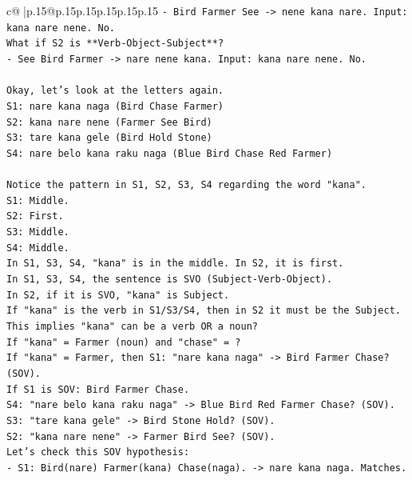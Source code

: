 \documentclass{article}
\begin{document}
{\begin{supertabular}{c@{$\;$}|p{.15\linewidth}@{}p{.15\linewidth}p{.15\linewidth}p{.15\linewidth}p{.15\linewidth}p{.15\linewidth}}
{{{\texttt{{-} Bird Farmer See {-}> nene kana nare. Input: kana nare nene. No.} \\
\texttt{What if S2 is **Verb{-}Object{-}Subject**?} \\
\texttt{{-} See Bird Farmer {-}> nare nene kana. Input: kana nare nene. No.} \\
\\ 
\texttt{Okay, let's look at the letters again.} \\
\texttt{S1: nare kana naga (Bird Chase Farmer)} \\
\texttt{S2: kana nare nene (Farmer See Bird)} \\
\texttt{S3: tare kana gele (Bird Hold Stone)} \\
\texttt{S4: nare belo kana raku naga (Blue Bird Chase Red Farmer)} \\
\\ 
\texttt{Notice the pattern in S1, S2, S3, S4 regarding the word "kana".} \\
\texttt{S1: Middle.} \\
\texttt{S2: First.} \\
\texttt{S3: Middle.} \\
\texttt{S4: Middle.} \\
\texttt{In S1, S3, S4, "kana" is in the middle. In S2, it is first.} \\
\texttt{In S1, S3, S4, the sentence is SVO (Subject{-}Verb{-}Object).} \\
\texttt{In S2, if it is SVO, "kana" is Subject.} \\
\texttt{If "kana" is the verb in S1/S3/S4, then in S2 it must be the Subject.} \\
\texttt{This implies "kana" can be a verb OR a noun?} \\
\texttt{If "kana" = Farmer (noun) and "chase" = ?} \\
\texttt{If "kana" = Farmer, then S1: "nare kana naga" {-}> Bird Farmer Chase? (SOV).} \\
\texttt{If S1 is SOV: Bird Farmer Chase.} \\
\texttt{S4: "nare belo kana raku naga" {-}> Blue Bird Red Farmer Chase? (SOV).} \\
\texttt{S3: "tare kana gele" {-}> Bird Stone Hold? (SOV).} \\
\texttt{S2: "kana nare nene" {-}> Farmer Bird See? (SOV).} \\
\texttt{Let's check this SOV hypothesis:} \\
\texttt{{-} S1: Bird(nare) Farmer(kana) Chase(naga). {-}> nare kana naga. Matches.} \\
}}}
\end{supertabular}}
\end{document}
